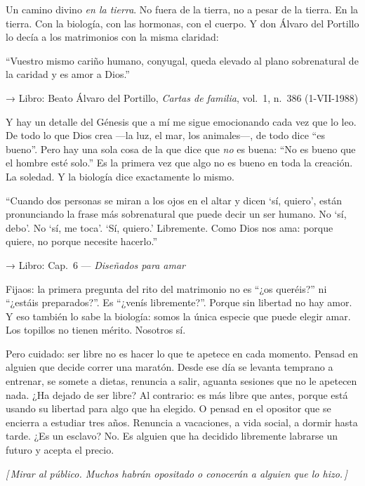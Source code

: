 \documentclass[a4paper, 11pt]{article}
\newcommand{\reflibro}[1]{%
  {\small\sffamily\color{gris} → Libro: #1}%
}
\newcommand{\nota}[1]{%
  \par\smallskip
  {\small\itshape\color{oro!80!black} [\,#1\,]}%
  \par\smallskip
}
\begin{document}
Un camino divino \emph{en la tierra}. No fuera de la tierra, no a pesar de la tierra. En la tierra. Con la biología, con las hormonas, con el cuerpo. Y don Álvaro del Portillo lo decía a los matrimonios con la misma claridad:

\begin{citalibro}
``Vuestro mismo cariño humano, conyugal, queda elevado al plano sobrenatural de la caridad y es amor a Dios.''
\end{citalibro}
\reflibro{Beato Álvaro del Portillo, \emph{Cartas de familia}, vol.~1, n.~386 (1-VII-1988)}

Y hay un detalle del Génesis que a mí me sigue emocionando cada vez que lo leo. De todo lo que Dios crea ---la luz, el mar, los animales---, de todo dice ``es bueno''. Pero hay una sola cosa de la que dice que \emph{no} es buena: ``No es bueno que el hombre esté solo.'' Es la primera vez que algo no es bueno en toda la creación. La soledad. Y la biología dice exactamente lo mismo.

\begin{citalibro}
``Cuando dos personas se miran a los ojos en el altar y dicen `sí, quiero', están pronunciando la frase más sobrenatural que puede decir un ser humano. No `sí, debo'. No `sí, me toca'. `Sí, quiero.' Libremente. Como Dios nos ama: porque quiere, no porque necesite hacerlo.''
\end{citalibro}
\reflibro{Cap.\ 6 — \emph{Diseñados para amar}}

Fijaos: la primera pregunta del rito del matrimonio no es ``¿os queréis?'' ni ``¿estáis preparados?''. Es ``¿venís libremente?''. Porque sin libertad no hay amor. Y eso también lo sabe la biología: somos la única especie que puede elegir amar. Los topillos no tienen mérito. Nosotros sí.

Pero cuidado: ser libre no es hacer lo que te apetece en cada momento. Pensad en alguien que decide correr una maratón. Desde ese día se levanta temprano a entrenar, se somete a dietas, renuncia a salir, aguanta sesiones que no le apetecen nada. ¿Ha dejado de ser libre? Al contrario: es más libre que antes, porque está usando su libertad para algo que ha elegido. O pensad en el opositor que se encierra a estudiar tres años. Renuncia a vacaciones, a vida social, a dormir hasta tarde. ¿Es un esclavo? No. Es alguien que ha decidido libremente labrarse un futuro y acepta el precio.

\nota{Mirar al público. Muchos habrán opositado o conocerán a alguien que lo hizo.}
\end{document}
